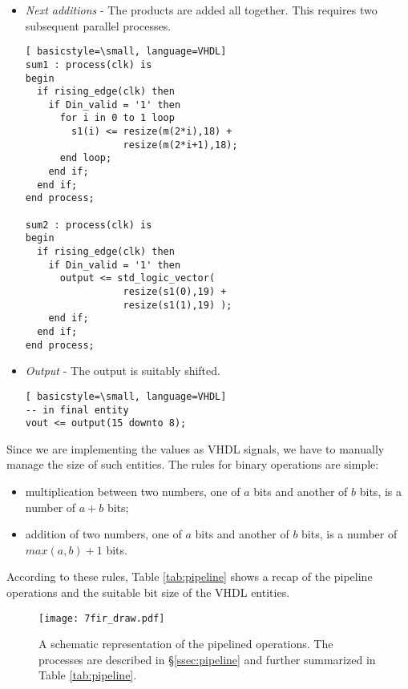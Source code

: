 \begin{itemize}
    \item \emph{Next additions} - The products are added all together. This requires two subsequent parallel processes.

\begin{lstlisting}[ basicstyle=\small, language=VHDL]
sum1 : process(clk) is
begin
  if rising_edge(clk) then
    if Din_valid = '1' then
      for i in 0 to 1 loop
        s1(i) <= resize(m(2*i),18) + 
                 resize(m(2*i+1),18);
      end loop;
    end if;    
  end if;
end process;

sum2 : process(clk) is
begin
  if rising_edge(clk) then
    if Din_valid = '1' then
      output <= std_logic_vector( 
                 resize(s1(0),19) + 
                 resize(s1(1),19) );
    end if;
  end if;
end process;
\end{lstlisting}


    \item \emph{Output} - The output is suitably shifted.

\begin{lstlisting}[ basicstyle=\small, language=VHDL]
-- in final entity
vout <= output(15 downto 8);
\end{lstlisting}

\end{itemize}

Since we are implementing the values as VHDL signals, we have to manually manage the size of such entities. The rules for binary operations are simple:
\begin{itemize}
    \item multiplication between two numbers, one of $a$ bits and another of $b$ bits, is a number of $a+b$ bits;
    \item addition of two numbers, one of $a$ bits and another of $b$ bits, is a number of $max(a,b)+1$ bits.
\end{itemize}
According to these rules, Table \ref{tab:pipeline} shows a recap of the pipeline operations and the suitable bit size of the VHDL entities.


\begin{figure}[H]
    \centering
    \caption{A schematic representation of the pipelined operations. The processes are described in §\ref{ssec:pipeline} and further summarized in Table \ref{tab:pipeline}.}
    \label{fig:scheme_symmetric}
    \texttt{[image: 7fir\_draw.pdf]}%
    \qquad
\end{figure}



